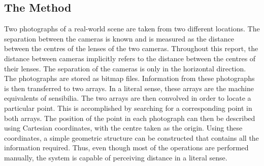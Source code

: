 \documentclass[12pt]{report}
\begin{document}
 \subsection*{The Method} Two photographs of a real-world scene are taken from two different locations. The separation between the cameras is known and is measured as the distance between the centres of the lenses of the two cameras. Throughout this report, the distance between cameras implicitly refers to the distance between the centres of their lenses. The separation of the cameras is only in the horizontal direction. The photographs are stored as bitmap files. Information from these photographs is then transferred to two arrays. In a literal sense, these arrays are the machine equivalents of sensibilia. The two arrays are then convolved in order to locate a particular point. This is accomplished by searching for a corresponding point in both arrays. The position of the point in each photograph can then be described using Cartesian coordinates, with the centre taken as the origin. Using these coordinates, a simple geometric structure can be constructed that contains all the information required. Thus, even though most of the operations are performed manually, the system is capable of perceiving distance in a literal sense. 
\end{document}
